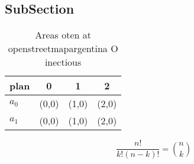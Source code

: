 \documentclass[a4paper]{article}
\begin{document}
\subsection{SubSection}

\begin{table}
\begin{adjustbox}{width=0.6\columnwidth}
\begin{tabular}{|l|l|l|l|}
\hline
\textbf{plan} & \multicolumn{1}{c|}{\textbf{0}} & \multicolumn{1}{c|}{\textbf{1}} & \multicolumn{1}{c|}{\textbf{2}} \\ \hline
\textbf{$a_0$}  & (0,0) & (1,0) & (2,0) \\ \hline
\textbf{$a_1$}  & (0,0) & (1,0) & (2,0) \\ \hline
\end{tabular}
\end{adjustbox}
\caption{Areas oten at openstreetmapargentina O inectious 
}
\end{table}

\[ \frac{n!}{k!(n-k)!} = \binom{n}{k} \]
\end{document}

